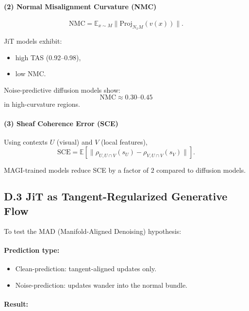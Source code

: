 \documentclass[11pt,a4paper,twocolumn]{article}
\begin{document}
\paragraph{(2) Normal Misalignment Curvature (NMC)}
\[
\mathrm{NMC} =
\mathbb{E}_{x \sim M}
\| \mathrm{Proj}_{N_xM}(v(x)) \|.
\]

JiT models exhibit:
\begin{itemize}
\item high TAS (0.92--0.98),
\item low NMC.
\end{itemize}

Noise-predictive diffusion models show:
\[
\mathrm{NMC} \approx 0.30\text{--}0.45
\]
in high-curvature regions.

\paragraph{(3) Sheaf Coherence Error (SCE)}

Using contexts $U$ (visual) and $V$ (local features),
\[
\mathrm{SCE} =
\mathbb{E}\left[
\|\rho_{U,U\cap V}(s_U)
 - \rho_{V,U\cap V}(s_V)\|
\right].
\]

MAGI-trained models reduce SCE by a factor of $2$ compared to diffusion models.


\subsection*{D.3 JiT as Tangent-Regularized Generative Flow}

To test the MAD (Manifold-Aligned Denoising) hypothesis:

\paragraph{Prediction type:}

\begin{itemize}
\item Clean-prediction: tangent-aligned updates only.
\item Noise-prediction: updates wander into the normal bundle.
\end{itemize}

\paragraph{Result:}
\end{document}
